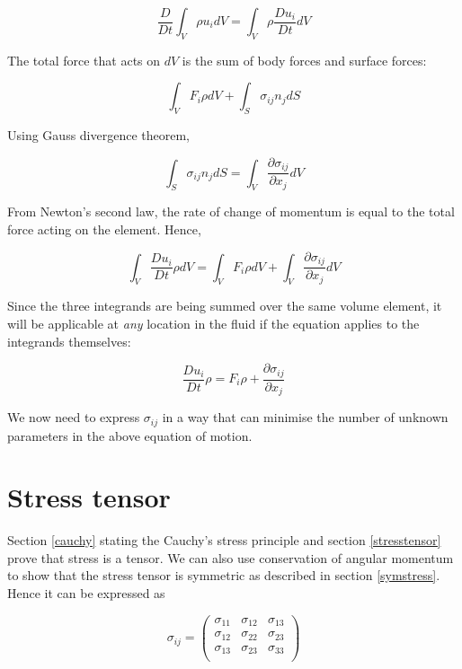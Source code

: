$$ \frac{D}{Dt} \int_{V}{\rho u_i dV} =  \int_{V}{\rho \frac{Du_i}{Dt} dV} $$

The total force that acts on $dV$ is the sum of body forces and surface forces:

$$ \int_{V}{F_i\rho dV} + \int_{S}{\sigma_{ij}n_jdS} $$

Using Gauss divergence theorem, 

\begin{equation}
\int_{S}{\sigma_{ij}n_jdS} = \int_{V}{\frac{\partial \sigma_{ij}}{\partial x_j}dV}
\end{equation} 

From Newton's second law, the rate of change of momentum is equal to the total force acting on the element. Hence,

\begin{equation}
\int_{V}{\frac{Du_i}{Dt}\rho dV}  =  \int_{V}{F_i\rho dV} + \int_{V}{\frac{\partial \sigma_{ij}}{\partial x_j}dV}
\end{equation} 

Since the three integrands are being summed over the same volume element, it will be applicable at {\em any} location in the fluid if the equation applies to the integrands themselves:

\begin{equation}
\label{eqmotion}
\boxed{\frac{Du_i}{Dt}\rho =  F_i\rho + \frac{\partial \sigma_{ij}}{\partial x_j}}
\end{equation} 

We now need to express $\sigma_{ij}$ in a way that can minimise the number of unknown parameters in the above equation of motion.

\section{Stress tensor}

Section \ref{cauchy} stating the Cauchy's stress principle and section \ref{stresstensor} prove that stress is a tensor. We can also use conservation of angular momentum to show that the stress tensor is symmetric as described in section \ref{symstress}. Hence it can be expressed as 

\begin{equation}
\sigma_{ij} = \left(
\begin{array}{lll}
\sigma_{11} & \sigma_{12} & \sigma_{13} \\ 
\sigma_{12} & \sigma_{22} & \sigma_{23} \\ 
\sigma_{13} & \sigma_{23} & \sigma_{33} \\ 
\end{array}
\right)
\end{equation} 

